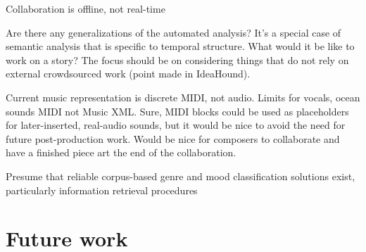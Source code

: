 \documentclass[final,authoryear,5p,times,twocolumn]{elsarticle}
\begin{document}
Collaboration is offline, not real-time

Are there any generalizations of the automated analysis? It's a special case of semantic analysis that is specific to temporal structure. What would it be like to work on a story? The focus should be on considering things that do not rely on external crowdsourced work (point made in IdeaHound).

Current music representation is discrete MIDI, not audio. Limits for vocals, ocean sounds
MIDI not Music XML. Sure, MIDI blocks could be used as placeholders for later-inserted, real-audio sounds, but it would be nice to avoid the need for future post-production work. Would be nice for composers to collaborate and have a finished piece art the end of the collaboration.

Presume that reliable corpus-based genre and mood classification solutions exist, particularly information retrieval procedures

\section {Future work}

 
\end{document}
